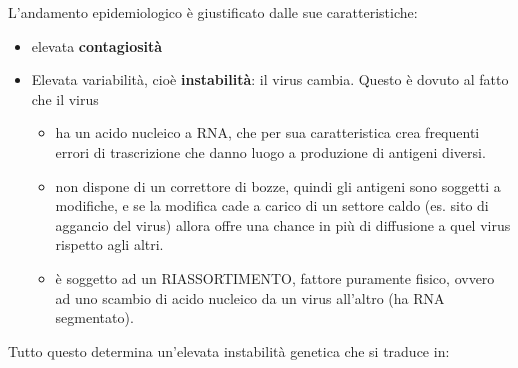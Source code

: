   L'andamento epidemiologico è giustificato dalle sue caratteristiche:
\begin{itemize}
\item elevata \textbf{contagiosità}
\item Elevata variabilità, cioè \textbf{instabilità}: il virus cambia.
  Questo è dovuto al fatto che il virus

\begin{itemize}
\item
  ha un acido nucleico a RNA, che per sua caratteristica crea frequenti
  errori di trascrizione che danno luogo a produzione di antigeni
  diversi.
\item
  non dispone di un correttore di bozze, quindi gli antigeni sono
  soggetti a modifiche, e se la modifica cade a carico di un settore
  caldo (es. sito di aggancio del virus) allora offre una chance in più
  di diffusione a quel virus rispetto agli altri.
\item
  è soggetto ad un RIASSORTIMENTO, fattore puramente fisico, ovvero ad
  uno scambio di acido nucleico da un virus all'altro (ha RNA
  segmentato).
  \end{itemize}
\end{itemize}
  Tutto questo determina un'elevata instabilità genetica che si traduce
  in:

